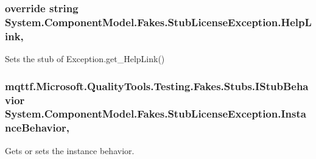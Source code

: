\hypertarget{class_system_1_1_component_model_1_1_fakes_1_1_stub_license_exception_a215f5134b5c15d749681b6eef6d59275}{
\subsubsection[{Help\-Link}]{\setlength{\rightskip}{0pt plus 5cm}override string System.\-Component\-Model.\-Fakes.\-Stub\-License\-Exception.\-Help\-Link\hspace{0.3cm}{\ttfamily [get]}, {\ttfamily [set]}}}\label{class_system_1_1_component_model_1_1_fakes_1_1_stub_license_exception_a215f5134b5c15d749681b6eef6d59275}


Sets the stub of Exception.\-get\-\_\-\-Help\-Link()

\hypertarget{class_system_1_1_component_model_1_1_fakes_1_1_stub_license_exception_a0c49c72eec1128d66a35763a04b0fac9}{
\subsubsection[{Instance\-Behavior}]{\setlength{\rightskip}{0pt plus 5cm}mqttf.\-Microsoft.\-Quality\-Tools.\-Testing.\-Fakes.\-Stubs.\-I\-Stub\-Behavior System.\-Component\-Model.\-Fakes.\-Stub\-License\-Exception.\-Instance\-Behavior\hspace{0.3cm}{\ttfamily [get]}, {\ttfamily [set]}}}\label{class_system_1_1_component_model_1_1_fakes_1_1_stub_license_exception_a0c49c72eec1128d66a35763a04b0fac9}


Gets or sets the instance behavior.

